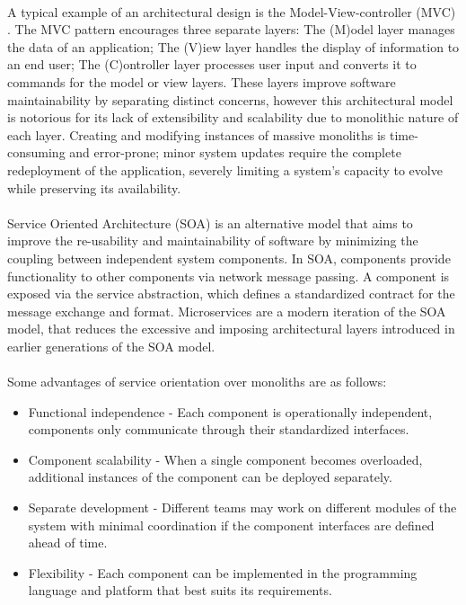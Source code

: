 \paragraph{}

A typical example of an architectural design is the Model-View-controller (MVC) \cite{mvc, microservices}.
The MVC pattern encourages three separate layers: The (M)odel layer manages the data of an application;
The (V)iew layer handles the display of information to an end user; The (C)ontroller layer
processes user input and converts it to commands for the model or view layers.
These layers improve software maintainability by separating distinct concerns,
however this architectural model is notorious for its lack of extensibility and scalability due to monolithic nature of each layer.
Creating and modifying instances of massive monoliths is time-consuming and error-prone;
minor system updates require the complete redeployment of the application, severely limiting a system's capacity to evolve while preserving its availability.

\paragraph{}

Service Oriented Architecture (SOA) \cite{7} is an alternative model that aims to
improve the re-usability and maintainability of software by minimizing the coupling between independent system components.
In SOA, components provide functionality to other components via network message passing.
A component is exposed via the service abstraction, which defines a standardized contract for the message exchange and format.
Microservices \cite{microservices} are a modern iteration of the SOA model,
that reduces the excessive and imposing architectural layers introduced in earlier generations of the SOA model.

\paragraph{}

Some advantages of service orientation over monoliths are as follows:
\begin{itemize}
    \item Functional independence - Each component is operationally independent, components only communicate through their standardized interfaces.
    \item Component scalability - When a single component becomes overloaded, additional instances of the component can be deployed separately.
    \item Separate development - Different teams may work on different modules of the system with minimal coordination if the component interfaces are defined ahead of time.
    \item Flexibility - Each component can be implemented in the programming language and platform that best suits its requirements.
\end{itemize}

